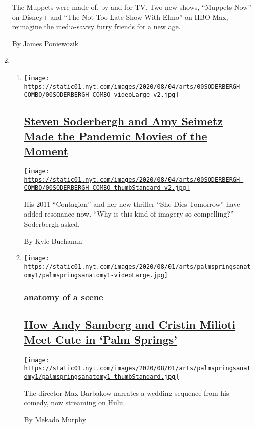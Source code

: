 \begin{enumerate}
  The Muppets were made of, by and for TV. Two new shows, ``Muppets
  Now'' on Disney+ and ``The Not-Too-Late Show With Elmo'' on HBO Max,
  reimagine the media-savvy furry friends for a new age.

  By James Poniewozik
\item
  \begin{enumerate}
  \def\labelenumii{\arabic{enumii}.}
  \item
    \texttt{[image: https://static01.nyt.com/images/2020/08/04/arts/00SODERBERGH-COMBO/00SODERBERGH-COMBO-videoLarge-v2.jpg]}

    \hypertarget{steven-soderbergh-and-amy-seimetz-made-the-pandemic-movies-of-the-moment}{%
    \subsection{\texorpdfstring{\href{/2020/07/31/movies/steven-soderbergh-amy-seimetz-pandemic.html}{Steven
    Soderbergh and Amy Seimetz Made the Pandemic Movies of the
    Moment}}{Steven Soderbergh and Amy Seimetz Made the Pandemic Movies of the Moment}}\label{steven-soderbergh-and-amy-seimetz-made-the-pandemic-movies-of-the-moment}}

    \href{/2020/07/31/movies/steven-soderbergh-amy-seimetz-pandemic.html}{\texttt{[image: https://static01.nyt.com/images/2020/08/04/arts/00SODERBERGH-COMBO/00SODERBERGH-COMBO-thumbStandard-v2.jpg]}}

    His 2011 ``Contagion'' and her new thriller ``She Dies Tomorrow''
    have added resonance now. ``Why is this kind of imagery so
    compelling?'' Soderbergh asked.

    By Kyle Buchanan
  \item
    \texttt{[image: https://static01.nyt.com/images/2020/08/01/arts/palmspringsanatomy1/palmspringsanatomy1-videoLarge.jpg]}

    \hypertarget{anatomy-of-a-scene}{%
    \subsubsection{anatomy of a scene}\label{anatomy-of-a-scene}}

    \hypertarget{how-andy-samberg-and-cristin-milioti-meet-cute-in-palm-springs}{%
    \subsection{\texorpdfstring{\href{/2020/07/31/movies/palm-springs-clip-hulu.html}{How
    Andy Samberg and Cristin Milioti Meet Cute in `Palm
    Springs'}}{How Andy Samberg and Cristin Milioti Meet Cute in `Palm Springs'}}\label{how-andy-samberg-and-cristin-milioti-meet-cute-in-palm-springs}}

    \href{/2020/07/31/movies/palm-springs-clip-hulu.html}{\texttt{[image: https://static01.nyt.com/images/2020/08/01/arts/palmspringsanatomy1/palmspringsanatomy1-thumbStandard.jpg]}}

    The director Max Barbakow narrates a wedding sequence from his
    comedy, now streaming on Hulu.

    By Mekado Murphy
  \end{enumerate}
\end{enumerate}


